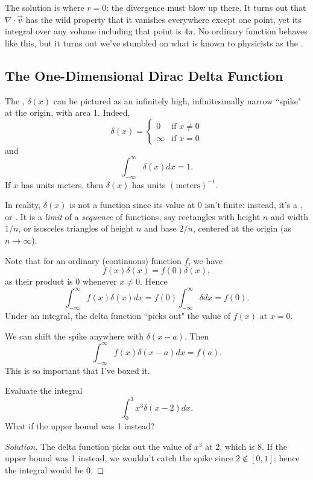The solution is where $r=0$: the divergence must blow up there. It turns out that $\nabla\cdot \vec{v}$ has the wild property that it vanishes everywhere except one point, yet its integral over any volume including that point is $4\pi$. No ordinary function behaves like this, but it turns out we've stumbled on what is known to physicists as the .

\subsection{The One-Dimensional Dirac Delta Function}

\begin{definition}
    The , $\delta(x)$ can be pictured as an infinitely high, infinitesimally narrow ``spike" at the origin, with area 1. Indeed,
    \[\delta(x)=\begin{cases}
    0 & \text{if }x\neq 0\\
    \infty & \text{if }x=0
    \end{cases}\]
    and
    \[\int_{-\infty}^\infty\delta(x)dx=1.\]
    If $x$ has units meters, then $\delta(x)$ has units $(\text{meters})^{-1}$.
\end{definition}

In reality, $\delta(x)$ is not a function since its value at $0$ isn't finite: instead, it's a , or . It is a \textit{limit} of a \textit{sequence} of functions, say rectangles with height $n$ and width $1/n$, or isosceles triangles of height $n$ and base $2/n$, centered at the origin (as $n\to\infty$).

Note that for an ordinary (continuous) function $f$, we have
\[f(x)\delta(x)=f(0)\delta(x),\]
as their product is 0 whenever $x\neq 0$. Hence
\[\int_{-\infty}^\infty f(x)\delta(x)dx=f(0)\int_{-\infty}^\infty\delta dx=f(0).\]
Under an integral, the delta function ``picks out" the value of $f(x)$ at $x=0$.

We can shift the spike anywhere with $\delta(x-a)$. Then
\[\boxed{\int_{-\infty}^{\infty}f(x)\delta(x-a)dx=f(a)}.\]
This is so important that I've boxed it.

\begin{example}
Evaluate the integral
\[\int_0^3x^3\delta(x-2)dx.\]
What if the upper bound was 1 instead?
\end{example}

\begin{proof}[Solution]
The delta function picks out the value of $x^3$ at $2$, which is $\boxed{8}$. If the upper bound was 1 instead, we wouldn't catch the spike since $2\not\in[0,1]$; hence the integral would be 0.
\end{proof}

